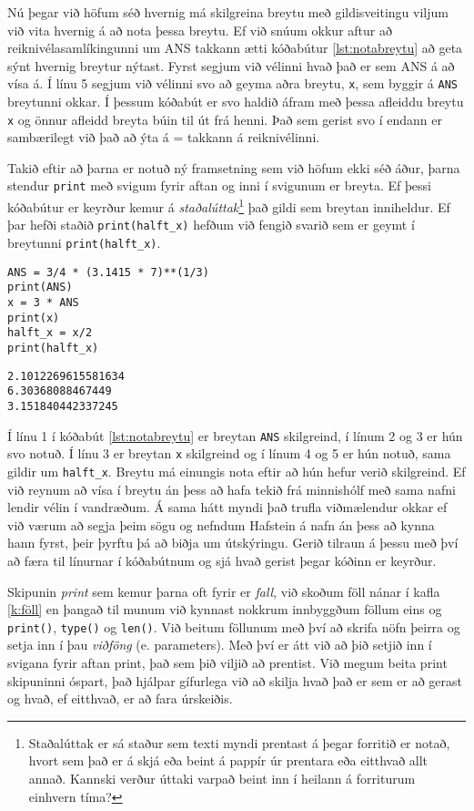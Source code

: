 Nú þegar við höfum séð hvernig má skilgreina breytu með gildisveitingu viljum við vita hvernig á að nota þessa breytu.
Ef við snúum okkur aftur að reiknivélasamlíkingunni um ANS takkann ætti kóðabútur \ref{lst:notabreytu} að geta sýnt hvernig breytur nýtast.
Fyrst segjum við vélinni hvað það er sem ANS á að vísa á. 
Í línu 5 segjum við vélinni svo að geyma aðra breytu, \texttt{x}, sem byggir á \texttt{ANS} breytunni okkar.
Í þessum kóðabút er svo haldið áfram með þessa afleiddu breytu \texttt{x} og önnur afleidd breyta búin til út frá henni.
Það sem gerist svo í endann er sambærilegt við það að ýta á = takkann á reiknivélinni.

Takið eftir að þarna er notuð ný framsetning sem við höfum ekki séð áður, þarna stendur \texttt{print} með svigum fyrir aftan og inni í svigunum er breyta.
Ef þessi kóðabútur er keyrður kemur á \textit{staðalúttak}\footnote{Staðalúttak er sá staður sem texti myndi prentast á þegar forritið er notað, hvort sem það er á skjá eða beint á pappír úr prentara eða eitthvað allt annað. 
Kannski verður úttaki varpað beint inn í heilann á forriturum einhvern tíma?} 
það gildi sem breytan inniheldur.
Ef þar hefði staðið \texttt{print(halft\_x)} hefðum við fengið svarið sem er geymt í breytunni \texttt{print(halft\_x)}.

\begin{lstlisting}[caption=Að nota breytu, label=lst:notabreytu]
ANS = 3/4 * (3.1415 * 7)**(1/3)
print(ANS)
x = 3 * ANS
print(x)
halft_x = x/2
print(halft_x)
\end{lstlisting}
\lstset{style=uttak}
\begin{lstlisting}
2.1012269615581634
6.30368088467449
3.151840442337245
\end{lstlisting}
\lstset{style=venjulegt}


Í línu 1 í kóðabút \ref{lst:notabreytu} er breytan \texttt{ANS} skilgreind, í línum 2 og 3 er hún svo notuð.
Í línu 3 er breytan \texttt{x} skilgreind og í línum 4 og 5 er hún notuð, sama gildir um \texttt{halft\_x}.
Breytu má einungis nota eftir að hún hefur verið skilgreind.
Ef við reynum að vísa í breytu án þess að hafa tekið frá minnishólf með sama nafni lendir vélin í vandræðum.
Á sama hátt myndi það trufla viðmælendur okkar ef við værum að segja þeim sögu og nefndum Hafstein á nafn án þess að kynna hann fyrst, þeir þyrftu þá að biðja um útskýringu.
Gerið tilraun á þessu með því að færa til línurnar í kóðabútnum og sjá hvað gerist þegar kóðinn er keyrður.


Skipunin \emph{print} sem kemur þarna oft fyrir er \textit{fall}, við skoðum föll nánar í kafla \ref{k:föll} en þangað til munum við kynnast nokkrum innbyggðum föllum eins og \texttt{print()}, \texttt{type()} og \texttt{len()}.
Við beitum föllunum með því að skrifa nöfn þeirra og setja inn í þau \emph{viðföng} (e. parameters).
Með því er átt við að þið setjið inn í svigana fyrir aftan print, það sem þið viljið að prentist.
Við megum beita print skipuninni óspart, það hjálpar gífurlega við að skilja hvað það er sem er að gerast og hvað, ef eitthvað, er að fara úrskeiðis.

